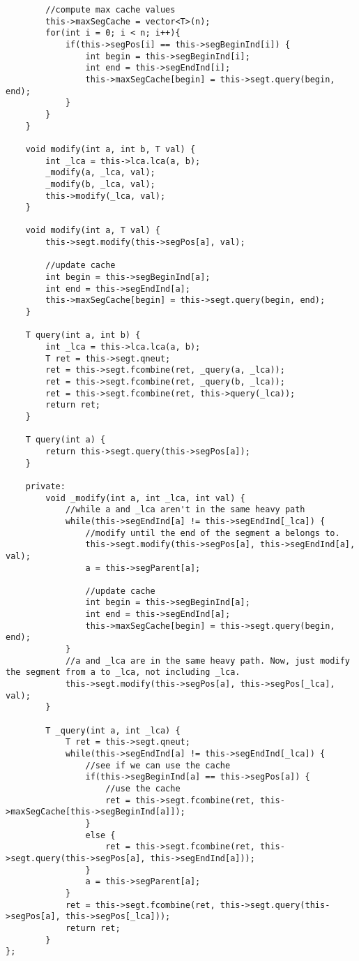 \documentclass[8pt, headheight=10pt, a4paper]{article}
\begin{document}
\begin{multicols*}{3}
\begin{lstlisting}
        //compute max cache values
        this->maxSegCache = vector<T>(n);
        for(int i = 0; i < n; i++){
            if(this->segPos[i] == this->segBeginInd[i]) {
                int begin = this->segBeginInd[i];
                int end = this->segEndInd[i];
                this->maxSegCache[begin] = this->segt.query(begin, end);
            }
        }
    }

    void modify(int a, int b, T val) {
        int _lca = this->lca.lca(a, b);
        _modify(a, _lca, val);
        _modify(b, _lca, val);
        this->modify(_lca, val);
    }

    void modify(int a, T val) {
        this->segt.modify(this->segPos[a], val);

        //update cache
        int begin = this->segBeginInd[a];
        int end = this->segEndInd[a];
        this->maxSegCache[begin] = this->segt.query(begin, end);
    }

    T query(int a, int b) {
        int _lca = this->lca.lca(a, b);
        T ret = this->segt.qneut;
        ret = this->segt.fcombine(ret, _query(a, _lca));
        ret = this->segt.fcombine(ret, _query(b, _lca));
        ret = this->segt.fcombine(ret, this->query(_lca));
        return ret;
    }

    T query(int a) {
        return this->segt.query(this->segPos[a]);
    }

    private:
        void _modify(int a, int _lca, int val) {
            //while a and _lca aren't in the same heavy path
            while(this->segEndInd[a] != this->segEndInd[_lca]) {
                //modify until the end of the segment a belongs to. 
                this->segt.modify(this->segPos[a], this->segEndInd[a], val);
                a = this->segParent[a];

                //update cache
                int begin = this->segBeginInd[a];
                int end = this->segEndInd[a];
                this->maxSegCache[begin] = this->segt.query(begin, end);
            }
            //a and _lca are in the same heavy path. Now, just modify the segment from a to _lca, not including _lca. 
            this->segt.modify(this->segPos[a], this->segPos[_lca], val);
        }

        T _query(int a, int _lca) {
            T ret = this->segt.qneut;
            while(this->segEndInd[a] != this->segEndInd[_lca]) {
                //see if we can use the cache
                if(this->segBeginInd[a] == this->segPos[a]) {
                    //use the cache
                    ret = this->segt.fcombine(ret, this->maxSegCache[this->segBeginInd[a]]);
                }
                else {
                    ret = this->segt.fcombine(ret, this->segt.query(this->segPos[a], this->segEndInd[a]));
                }
                a = this->segParent[a];
            }
            ret = this->segt.fcombine(ret, this->segt.query(this->segPos[a], this->segPos[_lca]));
            return ret;
        }
};
\end{lstlisting}


\end{multicols*}
\end{document}
